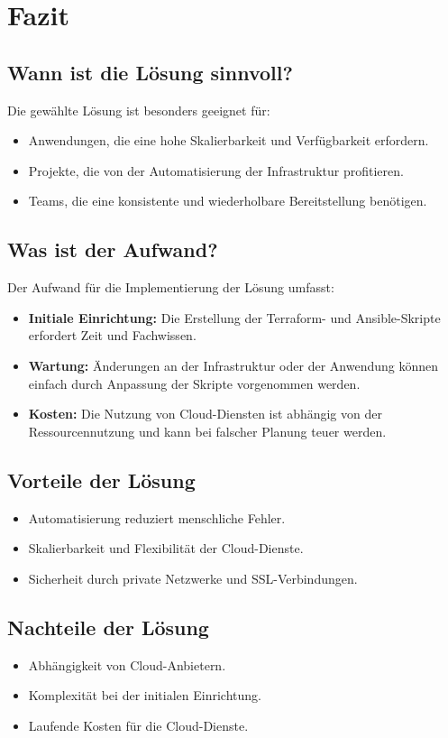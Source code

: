 
\chapter{Fazit}
\section{Wann ist die Lösung sinnvoll?}
Die gewählte Lösung ist besonders geeignet für:
\begin{itemize}
    \item Anwendungen, die eine hohe Skalierbarkeit und Verfügbarkeit erfordern.
    \item Projekte, die von der Automatisierung der Infrastruktur profitieren.
    \item Teams, die eine konsistente und wiederholbare Bereitstellung benötigen.
\end{itemize}

\section{Was ist der Aufwand?}
Der Aufwand für die Implementierung der Lösung umfasst:
\begin{itemize}
    \item \textbf{Initiale Einrichtung:} Die Erstellung der Terraform- und Ansible-Skripte erfordert Zeit und Fachwissen.
    \item \textbf{Wartung:} Änderungen an der Infrastruktur oder der Anwendung können einfach durch Anpassung der Skripte vorgenommen werden.
    \item \textbf{Kosten:} Die Nutzung von Cloud-Diensten ist abhängig von der Ressourcennutzung und kann bei falscher Planung teuer werden.
\end{itemize}

\section{Vorteile der Lösung}
\begin{itemize}
    \item Automatisierung reduziert menschliche Fehler.
    \item Skalierbarkeit und Flexibilität der Cloud-Dienste.
    \item Sicherheit durch private Netzwerke und SSL-Verbindungen.
\end{itemize}

\section{Nachteile der Lösung}
\begin{itemize}
    \item Abhängigkeit von Cloud-Anbietern.
    \item Komplexität bei der initialen Einrichtung.
    \item Laufende Kosten für die Cloud-Dienste.
\end{itemize}

